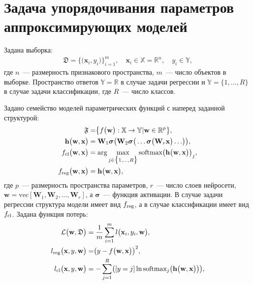 \section{Задача упорядочивания параметров аппроксимирующих моделей}
Задана выборка:
\[
\label{eq:st:1}
\begin{aligned}
\mathfrak{D} = \bigr\{\bigr(\textbf{x}_i, y_i\bigr)\bigr\}_{i=1}^{m}, \quad \textbf{x}_{i} \in \mathbb{X} = \mathbb{R}^{n}, \quad y_i \in \mathbb{Y},
\end{aligned}
\]
где $n$~--- размерность признакового пространства, $m$~--- число объектов в выборке. Пространство ответов $\mathbb{Y} = \mathbb{R}$ в случае задачи регрессии и  $\mathbb{Y} = \{1,\ldots, R\}$ в случае задачи классификации, где $R$~--- число классов.

Задано семейство моделей параметрических функций с наперед заданной структурой:
\[
\label{eq:st:2}
\begin{aligned}
\mathfrak{F} &= \bigr\{f\bigr(\textbf{w}\bigr):\mathbb{X} \to \mathbb{Y} | \textbf{w} \in \mathbb{R}^{p}\bigr\}, \\ 
\mathbf{h}\bigr(\textbf{w}, \textbf{x}\bigr) &= \textbf{W}_1\bm{\sigma}\bigr(\textbf{W}_2\bm{\sigma}\bigr(\ldots\bm{\sigma}\bigr(\textbf{W}_r\textbf{x}\bigr)\ldots\bigr)\bigr),\\
f_{\text{\text{cl}}}\bigr(\textbf{w}, \textbf{x}\bigr) &= \arg \max_{j \in \bigr\{1,\ldots, R\bigr\}} \text{softmax}\bigr(\mathbf{h}\bigr(\textbf{w}, \textbf{x}\bigr)\bigr)_{j}, \\ 
f_{\text{reg}}\bigr(\textbf{w}, \textbf{x}\bigr) & = \mathbf{h}\bigr(\textbf{w}, \textbf{x}\bigr), 
\end{aligned}
\]
где $p$~--- размерность пространства параметров, $r$~--- число слоев нейросети, $\textbf{w} = \text{vec}[\textbf{W}_1, \textbf{W}_2, \ldots, \textbf{W}_r]$, а $\bm{\sigma}$~--- функция активации. В случае задачи регрессии структура модели имеет вид $f_{\text{\text{reg}}}$, а в случае классификации имеет вид $f_{\text{\text{cl}}}$.
Задана функция потерь:
\[
\label{eq:st:3}
\begin{aligned}
\mathcal{L}\bigr(\textbf{w}, \mathfrak{D}\bigr) &= \frac{1}{m}\sum_{i=1}^{m}l\bigr(\textbf{x}_{i}, y_i, \textbf{w}\bigr),\\
l_{\text{\text{reg}}}\bigr(\textbf{x}, y, \textbf{w}\bigr) &= \bigr(y - f\bigr(\textbf{w}, \textbf{x}\bigr)\bigr)^{2},\\
l_{\text{\text{cl}}}\bigr(\textbf{x}, y, \textbf{w}\bigr) &= -\sum_{j=1}^{R}\bigr([y = j]\ln\text{softmax}_j\bigr(\mathbf{h}\bigr(\textbf{w}, \textbf{x}\bigr)\bigr)\bigr),
\end{aligned}
\]
